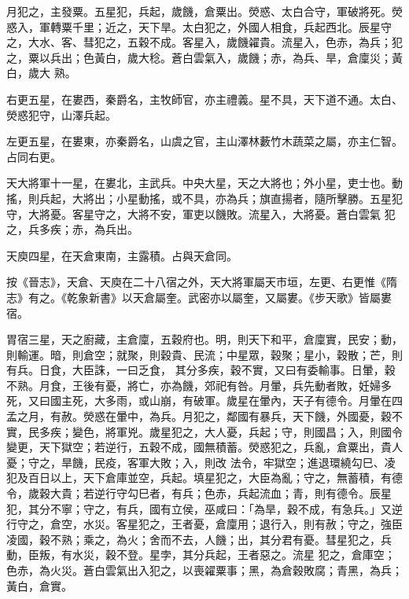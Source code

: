 \begin{pinyinscope}
 月犯之，主發粟。五星犯，兵起，歲饑，倉粟出。熒惑、太白合守，軍破將死。熒惑入，軍轉粟千里；近之，天下旱。太白犯之，外國人相食，兵起西北。辰星守之，大水、客、彗犯之，五穀不成。客星入，歲饑糴貴。流星入，色赤，為兵；犯之，粟以兵出；色黃白，歲大稔。蒼白雲氣入，歲饑；赤，為兵、旱，倉廩災；黃白，歲大
 熟。



 右更五星，在婁西，秦爵名，主牧師官，亦主禮義。星不具，天下道不通。太白、熒惑犯守，山澤兵起。



 左更五星，在婁東，亦秦爵名，山虞之官，主山澤林藪竹木蔬菜之屬，亦主仁智。占同右更。



 天大將軍十一星，在婁北，主武兵。中央大星，天之大將也；外小星，吏士也。動搖，則兵起，大將出；小星動搖，或不具，亦為兵；旗直揚者，隨所擊勝。五星犯守，大將憂。客星守之，大將不安，軍吏以饑敗。流星入，大將憂。蒼白雲氣
 犯之，兵多疾；赤，為兵出。



 天庾四星，在天倉東南，主露積。占與天倉同。



 按《晉志》，天倉、天庾在二十八宿之外，天大將軍屬天市垣，左更、右更惟《隋志》有之。《乾象新書》以天倉屬奎。武密亦以屬奎，又屬婁。《步天歌》皆屬婁宿。



 胃宿三星，天之廚藏，主倉廩，五穀府也。明，則天下和平，倉廩實，民安；動，則輸運。暗，則倉空；就聚，則穀貴、民流；中星眾，穀聚；星小，穀散；芒，則有兵。日食，大臣誅，一曰乏食，
 其分多疾，穀不實，又曰有委輸事。日暈，穀不熟。月食，王後有憂，將亡，亦為饑，郊祀有咎。月暈，兵先動者敗，妊婦多死，又曰國主死，大多雨，或山崩，有破軍。歲星在暈內，天子有德令。月暈在四孟之月，有赦。熒惑在暈中，為兵。月犯之，鄰國有暴兵，天下饑，外國憂，穀不實，民多疾；變色，將軍兇。歲星犯之，大人憂，兵起；守，則國昌；入，則國令變更，天下獄空；若逆行，五穀不成，國無積蓄。熒惑犯之，兵亂，倉粟出，貴人憂；守之，旱饑，民疫，客軍大敗；入，則改
 法令，牢獄空；進退環繞勾巳、凌犯及百日以上，天下倉庫並空，兵起。填星犯之，大臣為亂；守之，無蓄積，有德令，歲穀大貴；若逆行守勾巳者，有兵；色赤，兵起流血；青，則有德令。辰星犯，其分不寧；守之，有兵，國有立侯，巫咸曰：「為旱，穀不成，有急兵。」又逆行守之，倉空，水災。客星犯之，王者憂，倉廩用；退行入，則有赦；守之，強臣凌國，穀不熟；乘之，為火；舍而不去，人饑；出，其分君有憂。彗星犯之，兵動，臣叛，有水災，穀不登。星孛，其分兵起，王者惡之。流星
 犯之，倉庫空；色赤，為火災。蒼白雲氣出入犯之，以喪糴粟事；黑，為倉穀敗腐；青黑，為兵；黃白，倉實。




\end{pinyinscope}
